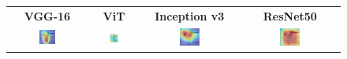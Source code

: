 \documentclass[a4paper,12pt]{report}
\begin{document}
\begin{figure}[H]
    \centering
    \setlength{\tabcolsep}{1pt}
    \begin{tabular}{cccc}
    \textbf{VGG-16} & \textbf{ViT} & \textbf{Inception v3} & \textbf{ResNet50} \\
    
    \includegraphics[width=0.22\textwidth]{images/appendix/modelgraph/vgg/correct/Glaucous_Winged_Gull/20241203_010647.jpg} &
    \includegraphics[width=0.22\textwidth]{images/appendix/modelgraph/vit/correct/Glaucous_Winged_Gull/20241203_010647.jpg} &
    \includegraphics[width=0.22\textwidth]{images/appendix/modelgraph/inception/correct/Glaucous_Winged_Gull/20241203_010647.jpg} &
    \includegraphics[width=0.22\textwidth]{images/appendix/modelgraph/resnet/correct/Glaucous_Winged_Gull/20241203_010647.jpg} \\
    \end{tabular}

    \label{fig:interpretability_glaucous_1}
\end{figure}
\end{document}
